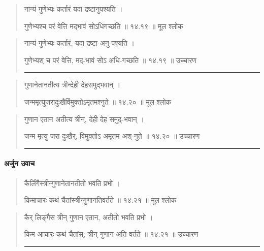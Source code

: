 \begin{quotation}

नान्यं गुणेभ्यः कर्तारं यदा द्रष्टानुपश्यति  ।  

गुणेभ्यश्च परं वेत्ति मद्भावं सोऽधिगच्छति  ॥ १४.१९ ॥  मूल श्लोक
\end{quotation}

\begin{quotation}

नान्यं गुणेभ्यः कर्तारं, यदा द्रष्टा अनु-पश्यति  ।  

गुणेभ्यश् च परं वेत्ति, मद्-भावं सोऽ अधि-गच्छति  ॥ १४.१९ ॥  उच्चारण

\noindent\rule{16cm}{0.4pt} 
\end{quotation}


\begin{quotation}

गुणानेतानतीत्य त्रीन्देही देहसमुद्भवान्‌  ।  

जन्ममृत्युजरादुःखैर्विमुक्तोऽमृतमश्नुते  ॥ १४.२० ॥  मूल श्लोक
\end{quotation}

\begin{quotation}

गुणान एतान अतीत्य त्रीन्, देही देह समुद्-भवान्‌  ।  

जन्म मृत्यु जरा दुःखैर्, विमुक्तोऽ अमृतम अश्-नुते  ॥ १४.२० ॥  उच्चारण

\noindent\rule{16cm}{0.4pt} 
\end{quotation}

\paragraph{\sanskrit अर्जुन उवाच}

\begin{quotation}

कैर्लिंगैस्त्रीन्गुणानेतानतीतो भवति प्रभो  ।  

किमाचारः कथं चैतांस्त्रीन्गुणानतिवर्तते  ॥ १४.२१ ॥  मूल श्लोक
\end{quotation}

\begin{quotation}

कैर् लिङ्गैस त्रीन् गुणान एतान, अतीतो भवति प्रभो  ।  

किम आचारः कथं चैतांस्, त्रीन् गुणान अति-वर्तते  ॥ १४.२१ ॥  उच्चारण

\noindent\rule{16cm}{0.4pt} 
\end{quotation}



